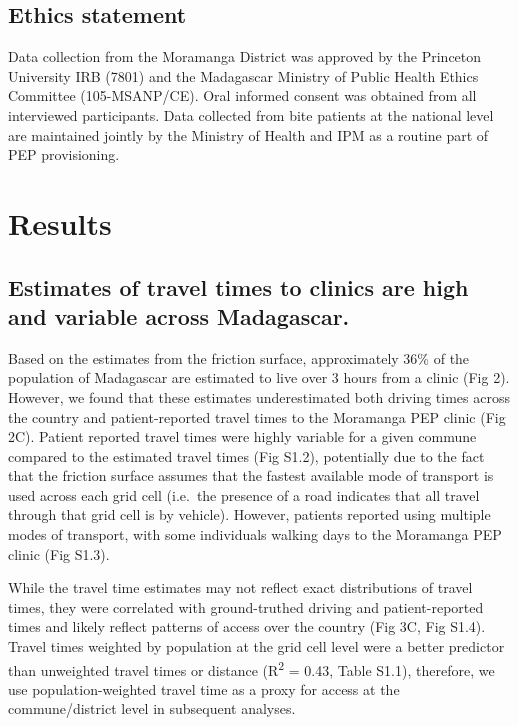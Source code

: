 \documentclass[
]{book}
\begin{document}
\hypertarget{ethics-statement-1}{%
\subsection{Ethics statement}\label{ethics-statement-1}}

Data collection from the Moramanga District was approved by the
Princeton University IRB (7801) and the Madagascar Ministry of Public
Health Ethics Committee (105-MSANP/CE). Oral informed consent was
obtained from all interviewed participants. Data collected from bite
patients at the national level are maintained jointly by the Ministry of
Health and IPM as a routine part of PEP provisioning.

\hypertarget{results-1}{%
\section{Results}\label{results-1}}

\hypertarget{estimates-of-travel-times-to-clinics-are-high-and-variable-across-madagascar.}{%
\subsection{Estimates of travel times to clinics are high and variable across Madagascar.}\label{estimates-of-travel-times-to-clinics-are-high-and-variable-across-madagascar.}}

Based on the estimates from the friction surface, approximately 36\% of
the population of Madagascar are estimated to live over 3 hours from a
clinic (Fig 2). However, we found that these estimates underestimated
both driving times across the country and patient-reported travel times
to the Moramanga PEP clinic (Fig 2C). Patient reported travel times were
highly variable for a given commune compared to the estimated travel
times (Fig S1.2), potentially due to the fact that the friction surface
assumes that the fastest available mode of transport is used across each
grid cell (i.e.~the presence of a road indicates that all travel through
that grid cell is by vehicle). However, patients reported using multiple
modes of transport, with some individuals walking days to the Moramanga
PEP clinic (Fig S1.3).

While the travel time estimates may not reflect exact distributions of
travel times, they were correlated with ground-truthed driving and
patient-reported times and likely reflect patterns of access over the
country (Fig 3C, Fig S1.4). Travel times weighted by population at the
grid cell level were a better predictor than unweighted travel times or
distance (R\textsuperscript{2} = 0.43, Table S1.1), therefore, we use
population-weighted travel time as a proxy for access at the
commune/district level in subsequent analyses.
\end{document}
